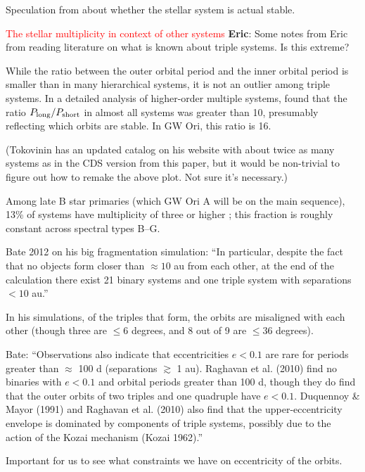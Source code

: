 \documentclass[twocolumn]{aastex61}
\newcommand{\todo}[1]{ \textcolor{red}{#1}}
\begin{document}
Speculation from \citet{berger11} about whether the stellar system is actual stable.


\todo{The stellar multiplicity in context of other systems}
\textbf{Eric}: Some notes from Eric from reading literature on what is known about triple systems.  Is this extreme?

While the ratio between the outer orbital period and the inner orbital period is smaller than in many hierarchical systems, it is not an outlier among triple systems.  In a detailed analysis of higher-order multiple systems, \citet{tokovinin97} found that the ratio $P_\mathrm{long} / P_{\rm short}$ in almost all systems was greater than 10, presumably reflecting which orbits are stable.  In GW Ori, this ratio is 16.

(Tokovinin has an updated catalog on his website with about twice as many systems as in the CDS version from this paper, but it would be non-trivial to figure out how to remake the above plot.  Not sure it's necessary.)

Among late B star primaries (which GW Ori A will be on the main sequence), 13\% of systems have multiplicity of three or higher \citep{eggleton08}; this fraction is roughly constant across spectral types B--G.


Bate 2012 on his big fragmentation simulation: ``In particular, despite the fact that no objects form closer than $\approx 10$ au from each other, at the end of the calculation there exist 21 binary systems and one triple system with separations $<10$ au.''

In his simulations, of the triples that form, the orbits are misaligned with each other (though three are $\leq 6$ degrees, and 8 out of 9 are $\leq 36$ degrees).

Bate:  ``Observations also indicate that eccentricities $e < 0.1$ are rare for periods greater than $\approx$ 100 d (separations $\gtrsim$ 1 au). Raghavan et al. (2010) find no binaries with $e < 0.1$ and orbital periods greater than 100 d, though they do find that the outer orbits of two triples and one quadruple have $e < 0.1$. Duquennoy \& Mayor (1991) and Raghavan et al. (2010) also find that the upper-eccentricity envelope is dominated by components of triple systems, possibly due to the action of the Kozai mechanism (Kozai 1962).''

Important for us to see what constraints we have on eccentricity of the orbits.

\end{document}
